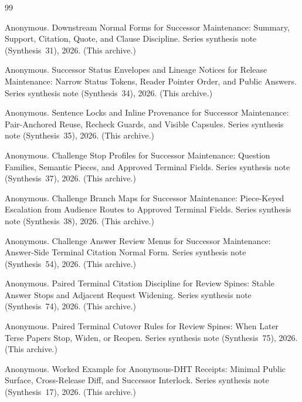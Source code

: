 \documentclass[11pt]{article}
\begin{document}
\begin{thebibliography}{99}\small

Anonymous.
\newblock Downstream Normal Forms for Successor Maintenance: Summary, Support, Citation, Quote, and Clause Discipline.
\newblock Series synthesis note (Synthesis~31), 2026. (This archive.)

Anonymous.
\newblock Successor Status Envelopes and Lineage Notices for Release Maintenance: Narrow Status Tokens, Reader Pointer Order, and Public Answers.
\newblock Series synthesis note (Synthesis~34), 2026. (This archive.)

Anonymous.
\newblock Sentence Locks and Inline Provenance for Successor Maintenance: Pair-Anchored Reuse, Recheck Guards, and Visible Capsules.
\newblock Series synthesis note (Synthesis~35), 2026. (This archive.)

Anonymous.
\newblock Challenge Stop Profiles for Successor Maintenance: Question Families, Semantic Pieces, and Approved Terminal Fields.
\newblock Series synthesis note (Synthesis~37), 2026. (This archive.)

Anonymous.
\newblock Challenge Branch Maps for Successor Maintenance: Piece-Keyed Escalation from Audience Routes to Approved Terminal Fields.
\newblock Series synthesis note (Synthesis~38), 2026. (This archive.)

Anonymous.
\newblock Challenge Answer Review Menus for Successor Maintenance: Answer-Side Terminal Citation Normal Form.
\newblock Series synthesis note (Synthesis~54), 2026. (This archive.)

Anonymous.
\newblock Paired Terminal Citation Discipline for Review Spines: Stable Answer Stops and Adjacent Request Widening.
\newblock Series synthesis note (Synthesis~74), 2026. (This archive.)

Anonymous.
\newblock Paired Terminal Cutover Rules for Review Spines: When Later Terse Papers Stop, Widen, or Reopen.
\newblock Series synthesis note (Synthesis~75), 2026. (This archive.)

Anonymous.
\newblock Worked Example for Anonymous-DHT Receipts: Minimal Public Surface, Cross-Release Diff, and Successor Interlock.
\newblock Series synthesis note (Synthesis~17), 2026. (This archive.)

\end{thebibliography}
\end{document}
